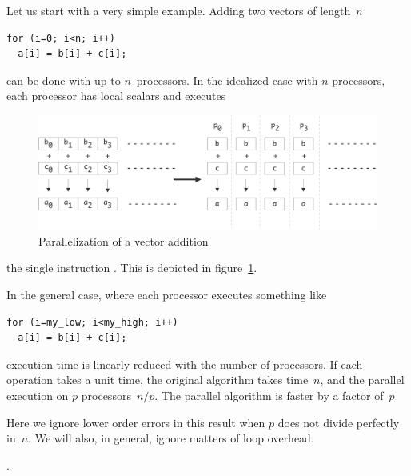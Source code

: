 Let us start with a very simple example. Adding two vectors of length~$n$
\begin{verbatim}
for (i=0; i<n; i++)
  a[i] = b[i] + c[i];
\end{verbatim}
can be done with up to $n$~processors. In the idealized case with $n$
processors, each processor has local scalars  and executes
\begin{figure}[ht]
  \includegraphics[scale=.11]{graphics/parallel-add}
  \caption{Parallelization of a vector addition}
  \label{fig:par-add}
\end{figure}
the single instruction . This is depicted in
figure~\ref{fig:par-add}.

In the general case, where each processor executes something like
\begin{verbatim}
for (i=my_low; i<my_high; i++)
  a[i] = b[i] + c[i];
\end{verbatim}
execution time is linearly
reduced with the number of processors. If each operation takes a unit
time, the original algorithm takes time~$n$, and the parallel
execution on $p$ processors~$n/p$. The parallel algorithm is faster by
a factor of~$p$%
\begin{footnoteenv}
  {Here we ignore lower order errors in this result
  when $p$ does not divide perfectly in~$n$. We will also, in general,
  ignore matters of loop overhead.}
\end{footnoteenv}
.

